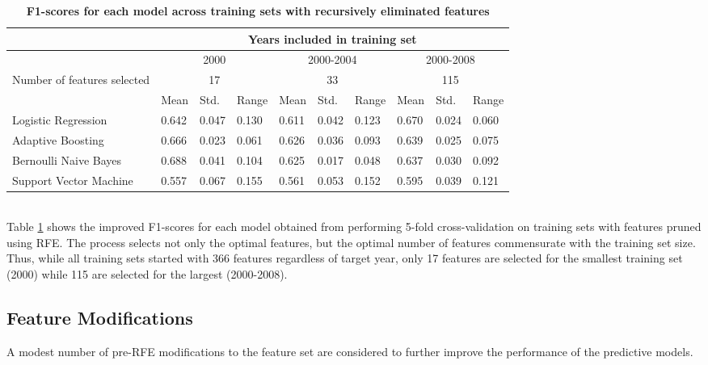 \documentclass{article}
\begin{document}
	\begin{table}[h]
		\begin{tabular}{|l|l|l|l|l|l|l|l|l|l|}
			\hline &
			\multicolumn{9}{|c|}{Years included in training set} \\
			\hline &
			\multicolumn{3}{|c|}{2000} &
			\multicolumn{3}{|c|}{2000-2004} &
			\multicolumn{3}{|c|}{2000-2008} \\
			\hline 
			Number of features selected &
			\multicolumn{3}{|c|}{17} &
			\multicolumn{3}{|c|}{33} &
			\multicolumn{3}{|c|}{115} \\
			\hline
			& Mean & Std. & Range & Mean & Std. & Range & Mean & Std. & Range \\
			\hline
			Logistic Regression & 0.642 & 0.047 & 0.130 & 0.611 & 0.042 & 0.123 & 0.670 & 0.024 & 0.060 \\
			\hline
			Adaptive Boosting & 0.666 & 0.023 & 0.061 & 0.626 & 0.036 & 0.093 & 0.639 & 0.025 & 0.075 \\
			\hline
			Bernoulli Naive Bayes & 0.688 & 0.041 & 0.104 & 0.625 & 0.017 & 0.048 & 0.637 & 0.030 & 0.092 \\
			\hline
			Support Vector Machine & 0.557 & 0.067 & 0.155 & 0.561 & 0.053 & 0.152 & 0.595 & 0.039 & 0.121 \\
			\hline
		\end{tabular}
		\caption{\textbf{F1-scores for each model across training sets with recursively eliminated features}}
		\label{table:rfe}
	\end{table}
	\hfill \\
	Table \ref{table:rfe} shows the improved F1-scores for each model obtained from performing 5-fold cross-validation on training sets with features pruned using RFE. The process selects not only the optimal features, but the optimal number of features commensurate with the training set size. Thus, while all training sets started with 366 features regardless of target year, only 17 features are selected for the smallest training set (2000) while 115 are selected for the largest (2000-2008).
	
	\subsection{Feature Modifications}
	
	A modest number of pre-RFE modifications to the feature set are considered to further improve the performance of the predictive models.
	
\end{document}
